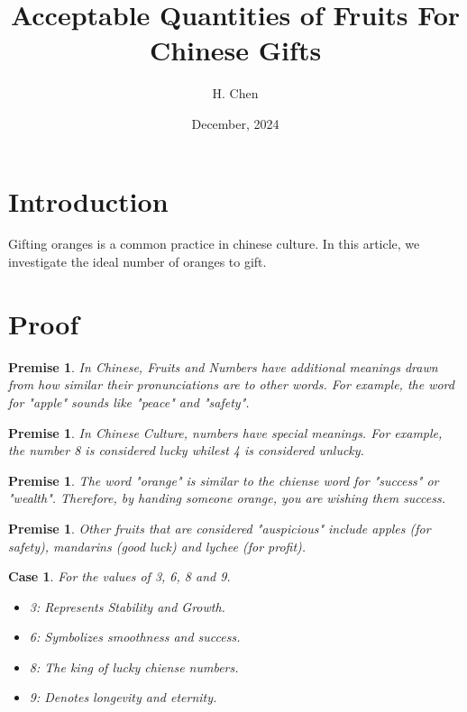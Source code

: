 \documentclass[10pt,a4paper]{article}
\newtheorem{premise}[theorem]{Premise}
\newtheorem{case}[theorem]{Case}
\begin{document}
\title{Acceptable Quantities of Fruits For Chinese Gifts}
\author{H. Chen}
\date{December, 2024}
\maketitle

\section{Introduction}
Gifting oranges is a common practice in chinese culture. In this article, we investigate the ideal number of oranges to gift.

\section{Proof}
\begin{premise}
    In Chinese, Fruits and Numbers have additional meanings drawn from how similar their pronunciations are to other words. For example, the word for "apple" sounds like "peace" and "safety".
\end{premise}

\begin{premise}
    In Chinese Culture, numbers have special meanings. For example, the number 8 is considered lucky whilest 4 is considered unlucky.
\end{premise}

\begin{premise}
    The word "orange" is similar to the chiense word for "success" or "wealth". Therefore, by handing someone orange, you are wishing them success.
\end{premise}

\begin{premise}
    Other fruits that are considered "auspicious" include apples (for safety), mandarins (good luck) and lychee (for profit).
\end{premise}

\begin{case}
    For the values of 3, 6, 8 and 9.

    \begin{itemize}
        \item 3: Represents Stability and Growth. 
        \item 6: Symbolizes smoothness and success.
        \item 8: The king of lucky chiense numbers.
        \item 9: Denotes longevity and eternity.
    \end{itemize}

\end{case}
\end{document}
